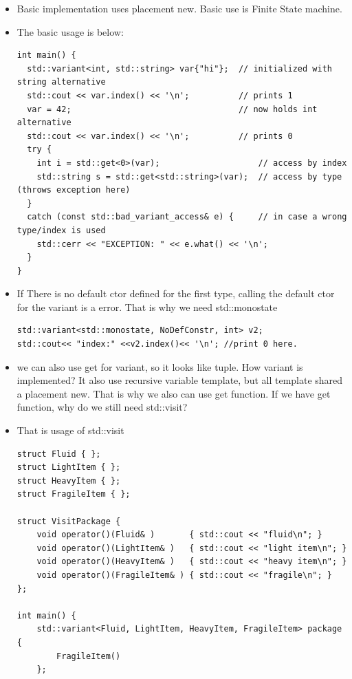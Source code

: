 \documentclass[a4paper,11pt,twoside]{book}
\begin{document}
\begin{itemize}
		\item Basic implementation uses placement new. Basic use is Finite State machine.

\item The basic usage is below: 

\begin{lstlisting}
int main() {
  std::variant<int, std::string> var{"hi"};  // initialized with string alternative
  std::cout << var.index() << '\n';          // prints 1
  var = 42;                                  // now holds int alternative
  std::cout << var.index() << '\n';          // prints 0
  try {
    int i = std::get<0>(var);                    // access by index
    std::string s = std::get<std::string>(var);  // access by type (throws exception here)
  }
  catch (const std::bad_variant_access& e) {     // in case a wrong type/index is used
    std::cerr << "EXCEPTION: " << e.what() << '\n';
  }
}
\end{lstlisting}

\item If There is no default ctor defined for the first type, calling the default ctor for the variant is a error. That is why we need std::monostate

\begin{lstlisting}
std::variant<std::monostate, NoDefConstr, int> v2;
std::cout<< "index:" <<v2.index()<< '\n'; //print 0 here.
\end{lstlisting}

\item we can also use get for variant, so it looks like tuple. How variant is implemented? It also use recursive variable template, but all template shared a placement new. That is why we also can use get function. If we have get function, why do we still need std::visit?

\item That is usage of std::visit
\begin{lstlisting}
struct Fluid { };
struct LightItem { };
struct HeavyItem { };
struct FragileItem { };

struct VisitPackage {
    void operator()(Fluid& )       { std::cout << "fluid\n"; }
    void operator()(LightItem& )   { std::cout << "light item\n"; }
    void operator()(HeavyItem& )   { std::cout << "heavy item\n"; }
    void operator()(FragileItem& ) { std::cout << "fragile\n"; }
};

int main() {
    std::variant<Fluid, LightItem, HeavyItem, FragileItem> package { 
        FragileItem()
    };
    

\end{lstlisting}
\end{itemize}
\end{document}
